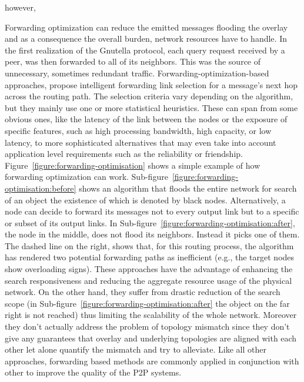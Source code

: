 however,

Forwarding optimization can reduce the emitted messages flooding the overlay and
as a consequence the overall burden, network resources have to handle. In the
first realization of the Gnutella protocol, each query request received by a
peer, was then forwarded to all of its neighbors. This was the source of
unnecessary, sometimes redundant traffic. Forwarding-optimization-based
approaches, propose intelligent forwarding link selection for a message's next
hop across the routing path. The selection criteria vary depending on the
algorithm, but they mainly use one or more statistical heuristics. These can
span from some obvious ones, like the latency of the link between the nodes or
the exposure of specific features, such as high processing bandwidth, high
capacity, or low latency, to more sophisticated alternatives that may even take
into account application level requirements such as the reliability or
friendship. Figure~\ref{figure:forwarding-optimisation} shows a simple example
of how forwarding optimization can work.
Sub-figure~\ref{figure:forwarding-optimisation:before} shows an algorithm that
floods the entire network for search of an object the existence of which is
denoted by black nodes. Alternatively, a node can decide to forward its
messages not to every output link but to a specific or subset of its output
links. In Sub-figure~\ref{figure:forwarding-optimisation:after}, the node in the
middle, does not flood its neighbors. Instead it picks one of them. The dashed
line on the right, shows that, for this routing process, the algorithm has
rendered two potential forwarding paths as inefficient (e.g., the target nodes
show overloading signs). These approaches have the advantage of enhancing the
search responsiveness and reducing the aggregate resource usage of the physical
network. On the other hand, they suffer from drastic reduction of the search
scope (in Sub-figure~\ref{figure:forwarding-optimisation:after} the object on
the far right is not reached) thus limiting the scalability of the whole
network. Moreover they don't actually address the problem of topology mismatch
since they don't give any guarantees that overlay and underlying topologies are
aligned with each other let alone quantify the mismatch and try to alleviate.
Like all other approaches, forwarding based methods are commonly applied in
conjunction with other to improve the quality of the P2P systems.

